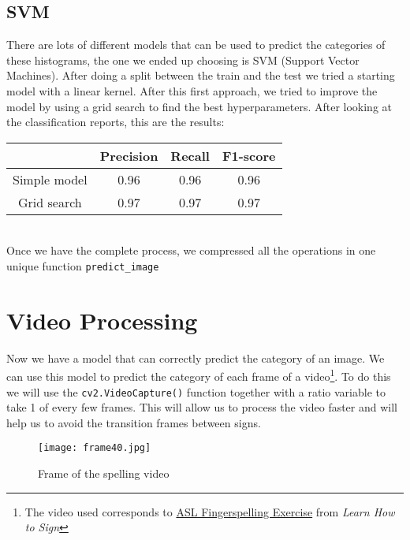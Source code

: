 \documentclass[9pt,a4paper,twoside]{tau-class/tau}
\begin{document}
    \subsection{SVM}
        There are lots of different models that can be used to predict the categories of these histograms, the one we ended up choosing is SVM
        (Support Vector Machines). After doing a split between the train and the test we tried a starting model with a linear kernel. After 
        this first approach, we tried to improve the model by using a grid search to find the best hyperparameters. After looking at the classification reports, this are the results:\\

        \begin{tabular}{c | c c c}
            \centering
            & Precision & Recall & F1-score \\
            \hline
            Simple model & 0.96 & 0.96 & 0.96 \\
            Grid search & 0.97 & 0.97 & 0.97 \\
        \end{tabular}\\
		
        Once we have the complete process, we compressed all the operations in one unique function \verb|predict_image|
        \nolinenumbers
            
	    \linenumbers
\section{Video Processing}
        
        Now we have a model that can correctly predict the category of an image. We can use this model to predict the category of each frame of a video\footnote{The video used corresponds to \href{https://www.youtube.com/watch?v=FK1aj2Aw1Mg}{ASL Fingerspelling Exercise} from \textit{Learn How to Sign}}.
        To do this we will use the \verb|cv2.VideoCapture()| function together with a ratio variable to take 1 of every few frames. This will allow us to
        process the video faster and will help us to avoid the transition frames between signs.\\

        \begin{figure}[H]
            \centering
            \texttt{[image: frame40.jpg]}
            \caption{Frame of the spelling video}
            \label{fig:Frame}
        \end{figure}
\end{document}
